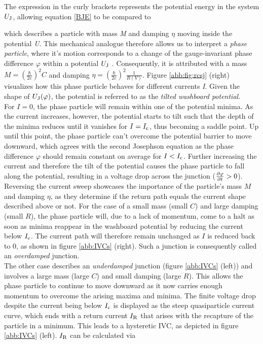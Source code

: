 The expression in the curly brackets represents the potential energy in the system $U_{\rm J}$, allowing equation \ref{BJE} to be compared to 


which describes a particle with mass \textit{M} and damping $\eta$ moving inside the potential \textit{U}. This mechanical analogue therefore allows us to interpret a \textit{phase particle}, where it's motion corresponds to a change of the gauge-invariant phase difference $\varphi$ within a potential $U_{\rm J}$ \cite{Clarke2004}. Consequently, it is attributed with a mass $M=\left(\frac{\hbar}{2 e}\right)^2C$ and damping $\eta=\left(\frac{\hbar}{2 e}\right)^2\frac{1}{R(V)}$. Figure \ref{abb:fig:rcsj} (right) visualizes how this phase particle behaves for different currents \textit{I}. Given the shape of $U_{\rm J}(\varphi)$, the potential is referred to as the \textit{tilted washboard potential}. \\
For $I=0$, the phase particle will remain within one of the potential minima. As the current increases, however, the potential starts to tilt such that the depth of the minima reduces until it vanishes for $I=I_{\rm c}$, thus becoming a saddle point. Up until this point, the phase particle can't overcome the potential barrier to move downward, which agrees with the second Josephson equation as the phase difference $\varphi$ should remain constant on average for $I<I_{\rm c}$. Further increasing the current and therefore the tilt of the potential causes the phase particle to fall along the potential, resulting in a voltage drop across the junction ($\frac{\partial\varphi}{\partial t}>0$). \\

Reversing the current sweep showcases the importance of the particle's mass $M$ and damping $\eta$, as they determine if the return path equals the current shape described above or not. For the case of a small mass (small $C$) and large damping (small $R$), the phase particle will, due to a lack of momentum, come to a halt as soon as minima reappear in the washboard potential by reducing the current below $I_{\rm c}$. The current path will therefore remain unchanged as $I$ is reduced back to 0, as shown in figure \ref{abb:IVCs} (right). Such a junction is consequently called an \textit{overdamped} junction. \\
The other case describes an \textit{underdamped} junction (figure \ref{abb:IVCs} (left)) and involves a large mass (large $C$) and small damping (large $R$). This allows the phase particle to continue to move downward as it now carries enough momentum to overcome the arising maxima and minima. The finite voltage drop despite the current being below $I_{\rm c}$ is displayed as the steep quasiparticle current curve, which ends with a return current $I_{\rm R}$ that arises with the recapture of the particle in a minimum. This leads to a hysteretic IVC, as depicted in figure \ref{abb:IVCs} (left). $I_{\rm R}$ can be calculated via \cite{Likharev1986}

